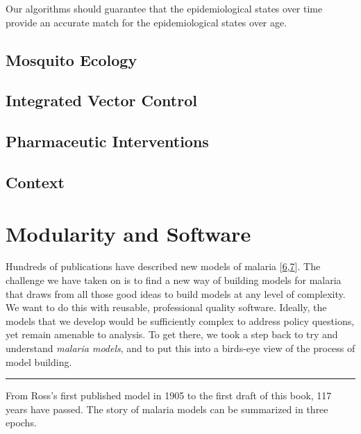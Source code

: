 \documentclass[
]{book}
\begin{document}
Our algorithms should guarantee that the epidemiological states over time provide an accurate match for the epidemiological states over age.

\hypertarget{mosquito-ecology-1}{%
\section{Mosquito Ecology}\label{mosquito-ecology-1}}

\hypertarget{integrated-vector-control}{%
\section{Integrated Vector Control}\label{integrated-vector-control}}

\hypertarget{pharmaceutic-interventions}{%
\section{Pharmaceutic Interventions}\label{pharmaceutic-interventions}}

\hypertarget{context}{%
\section{Context}\label{context}}

\hypertarget{modularity-and-software}{%
\chapter{Modularity and Software}\label{modularity-and-software}}

Hundreds of publications have described new models of malaria {[}\protect\hyperlink{ref-ReinerRCJ2013SystematicReview}{6},\protect\hyperlink{ref-SmithNR2018AgentbasedModels}{7}{]}. The challenge we have taken on is to find a new way of building models for malaria that draws from all those good ideas to build models at any level of complexity. We want to do this with reusable, professional quality software. Ideally, the models that we develop would be sufficiently complex to address policy questions, yet remain amenable to analysis. To get there, we took a step back to try and understand \emph{malaria models}, and to put this into a birds-eye view of the process of model building.

\begin{center}\rule{0.5\linewidth}{0.5pt}\end{center}

From Ross's first published model in 1905 to the first draft of this book, 117 years have passed. The story of malaria models can be summarized in three epochs.
\end{document}
